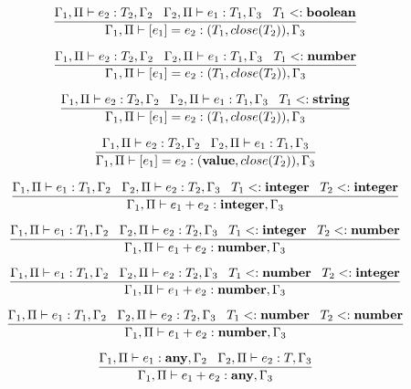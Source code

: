\[
\dfrac{\Gamma_{1}, \Pi \vdash e_{2}:T_{2}, \Gamma_{2} \;\;\;
       \Gamma_{2}, \Pi \vdash e_{1}:T_{1}, \Gamma_{3} \;\;\;
       T_{1} <: \mathbf{boolean}}
      {\Gamma_{1}, \Pi \vdash [e_{1}] = e_{2}: (T_{1},close(T_{2})), \Gamma_{3}}
\]

\[
\dfrac{\Gamma_{1}, \Pi \vdash e_{2}:T_{2}, \Gamma_{2} \;\;\;
       \Gamma_{2}, \Pi \vdash e_{1}:T_{1}, \Gamma_{3} \;\;\;
       T_{1} <: \mathbf{number}}
      {\Gamma_{1}, \Pi \vdash [e_{1}] = e_{2}: (T_{1},close(T_{2})), \Gamma_{3}}
\]

\[
\dfrac{\Gamma_{1}, \Pi \vdash e_{2}:T_{2}, \Gamma_{2} \;\;\;
       \Gamma_{2}, \Pi \vdash e_{1}:T_{1}, \Gamma_{3} \;\;\;
       T_{1} <: \mathbf{string}}
      {\Gamma_{1}, \Pi \vdash [e_{1}] = e_{2}: (T_{1},close(T_{2})), \Gamma_{3}}
\]

\[
\dfrac{\Gamma_{1}, \Pi \vdash e_{2}:T_{2}, \Gamma_{2} \;\;\;
       \Gamma_{2}, \Pi \vdash e_{1}:T_{1}, \Gamma_{3}}
      {\Gamma_{1}, \Pi \vdash [e_{1}] = e_{2}: (\mathbf{value},close(T_{2})), \Gamma_{3}}
\]

\[
\dfrac{\Gamma_{1}, \Pi \vdash e_{1}:T_{1}, \Gamma_{2} \;\;\;
       \Gamma_{2}, \Pi \vdash e_{2}:T_{2}, \Gamma_{3} \;\;\;
       T_{1} <: \mathbf{integer} \;\;\;
       T_{2} <: \mathbf{integer}}
      {\Gamma_{1}, \Pi \vdash e_{1} + e_{2}:\mathbf{integer}, \Gamma_{3}}
\]

\[
\dfrac{\Gamma_{1}, \Pi \vdash e_{1}:T_{1}, \Gamma_{2} \;\;\;
       \Gamma_{2}, \Pi \vdash e_{2}:T_{2}, \Gamma_{3} \;\;\;
       T_{1} <: \mathbf{integer} \;\;\;
       T_{2} <: \mathbf{number}}
      {\Gamma_{1}, \Pi \vdash e_{1} + e_{2}:\mathbf{number}, \Gamma_{3}}
\]

\[
\dfrac{\Gamma_{1}, \Pi \vdash e_{1}:T_{1}, \Gamma_{2} \;\;\;
       \Gamma_{2}, \Pi \vdash e_{2}:T_{2}, \Gamma_{3} \;\;\;
       T_{1} <: \mathbf{number} \;\;\;
       T_{2} <: \mathbf{integer}}
      {\Gamma_{1}, \Pi \vdash e_{1} + e_{2}:\mathbf{number}, \Gamma_{3}}
\]

\[
\dfrac{\Gamma_{1}, \Pi \vdash e_{1}:T_{1}, \Gamma_{2} \;\;\;
       \Gamma_{2}, \Pi \vdash e_{2}:T_{2}, \Gamma_{3} \;\;\;
       T_{1} <: \mathbf{number} \;\;\;
       T_{2} <: \mathbf{number}}
      {\Gamma_{1}, \Pi \vdash e_{1} + e_{2}:\mathbf{number}, \Gamma_{3}}
\]

\[
\dfrac{\Gamma_{1}, \Pi \vdash e_{1}:\mathbf{any}, \Gamma_{2} \;\;\;
       \Gamma_{2}, \Pi \vdash e_{2}:T, \Gamma_{3}}
      {\Gamma_{1}, \Pi \vdash e_{1} + e_{2}:\mathbf{any}, \Gamma_{3}}
\]

